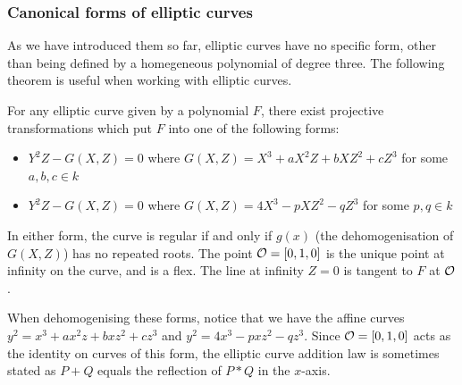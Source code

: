 \subsubsection{Canonical forms of elliptic curves}
As we have introduced them so far, elliptic curves have no specific form, other than being defined by a homegeneous polynomial of degree three.
The following theorem is useful when working with elliptic curves.
\begin{theorem}
	For any elliptic curve given by a polynomial $F$, there exist projective transformations which put $F$ into one of the following forms:
	\begin{itemize}
		\item $Y^2Z - G(X,Z) = 0$ where $G(X,Z) = X^3 + aX^2Z + bXZ^2 + cZ^3$ for some $a,b,c\in k$
		\item $Y^2Z - G(X,Z) = 0$ where $G(X,Z) = 4X^3 - pXZ^2 - qZ^3$ for some $p,q\in k$
	\end{itemize}
	In either form, the curve is regular if and only if $g(x)$ (the dehomogenisation of $G(X,Z)$) has no repeated roots.
	The point $\mathcal{O} = [0,1,0]$ is the unique point at infinity on the curve, and is a flex.
	The line at infinity $Z = 0$ is tangent to $F$ at $\mathcal{O}$.
\end{theorem}
When dehomogenising these forms, notice that we have the affine curves $y^2 = x^3 + ax^2z + bxz^2 + cz^3$ and $y^2 = 4x^3 - pxz^2 - qz^3$.
Since $\mathcal{O} = [0,1,0]$ acts as the identity on curves of this form, the elliptic curve addition law is sometimes stated as $P + Q$ equals the reflection of $P * Q$ in the $x$-axis.
